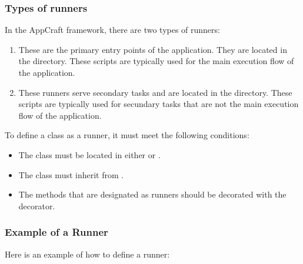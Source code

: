 \documentclass[letterpaper,10pt,english]{sphinxhowto}
\begin{document}
\subsubsection{Types of runners}
\label{\detokenize{architecture/runner/index:types-of-runners}}
\sphinxAtStartPar
In the AppCraft framework, there are two types of runners:
\begin{enumerate}
%
\item {} \begin{description}
\sphinxAtStartPar
These are the primary entry points of the application. They are located in the  directory. These scripts are typically used for the main execution flow of the application.

\end{description}

\item {} \begin{description}
\sphinxAtStartPar
These runners serve secondary tasks and are located in the  directory. These scripts are typically used for secundary tasks that are not the main execution flow of the application.

\end{description}

\end{enumerate}

\sphinxAtStartPar
To define a class as a runner, it must meet the following conditions:
\begin{itemize}
\item {} 
\sphinxAtStartPar
The class must be located in either  or .

\item {} 
\sphinxAtStartPar
The class must inherit from .

\item {} 
\sphinxAtStartPar
The methods that are designated as runners should be decorated with the  decorator.

\end{itemize}


\subsubsection{Example of a Runner}
\label{\detokenize{architecture/runner/index:example-of-a-runner}}
\sphinxAtStartPar
Here is an example of how to define a runner:
\end{document}
